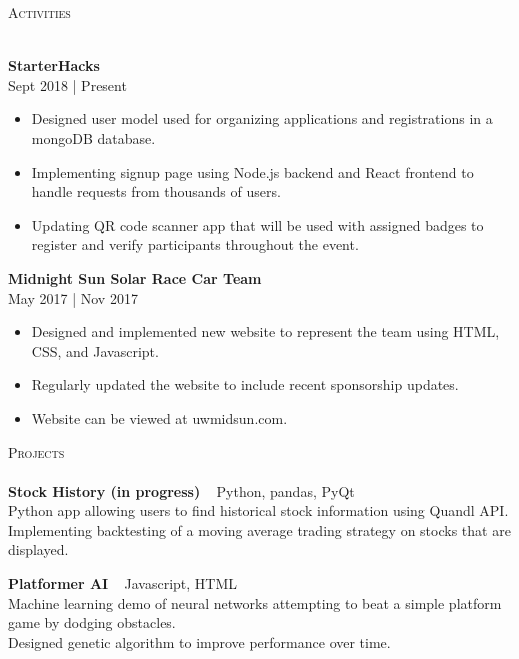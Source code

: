 \documentclass[a4paper]{article}
\newcommand{\lineunder} {
    \vspace*{-8pt} \\
    \hspace*{-18pt} \hrulefill \\
}
\newcommand{\header} [1] {
    {\hspace*{-18pt}\vspace*{6pt} \textsc{#1}}
    \vspace*{-6pt} \lineunder
}
\begin{document}
\header{Activities}
\vspace{1mm}

\textbf{StarterHacks} \hfill \\
 \hfill Sept 2018 | Present\\
\vspace{-1mm}
\begin{itemize} \itemsep 1pt
    \item Designed user model used for organizing applications and registrations in a mongoDB database.
    \item Implementing signup page using Node.js backend and React frontend to handle requests from thousands of users.
    \item Updating QR code scanner app that will be used with assigned badges to register and verify participants throughout the event.
\end{itemize}

\textbf{Midnight Sun Solar Race Car Team}\\
 \hfill May 2017 | Nov 2017\\
\vspace{-1mm}
\begin{itemize} \itemsep 1pt
	\item Designed and implemented new website to represent the team using HTML, CSS, and Javascript.
	\item Regularly updated the website to include recent sponsorship updates.
	\item Website can be viewed at uwmidsun.com.
\end{itemize}

\header{Projects}
{\textbf{Stock History (in progress)}} {\ \textbar{} Python, pandas, PyQt } \\
Python app allowing users to find historical stock information using Quandl API.\\
Implementing backtesting of a moving average trading strategy on stocks that are displayed.\\
\vspace*{2mm}

{\textbf{Platformer AI}} {\ \textbar{} Javascript, HTML} \\
Machine learning demo of neural networks attempting to beat a simple platform game by dodging obstacles.\\
Designed genetic algorithm to improve performance over time.\\
\vspace*{2mm}
\end{document}
